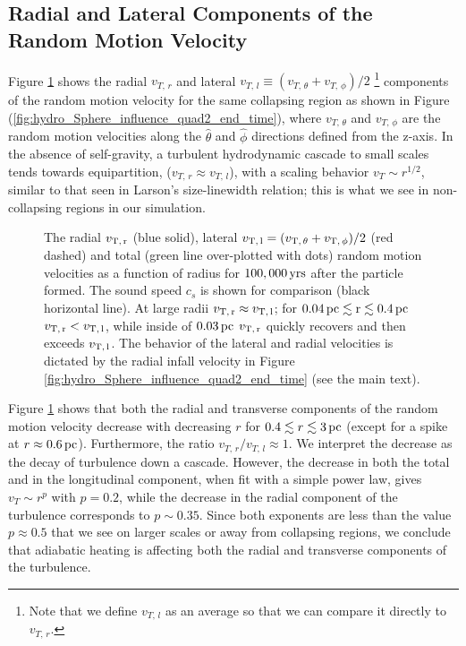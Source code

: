 \documentclass[../dissertation.tex]{subfiles}
\begin{document}
\subsection{Radial and Lateral Components of the Random Motion
  Velocity}\label{sec:hydro_turbulent components}
Figure \ref{fig:hydro_make_up_of_Turbulent} shows the radial 
$v_{T,\,r}$ and lateral 
$v_{T,\,l}\equiv (v_{T,\,\theta}+v_{T,\,\phi})/2$ \footnote{Note that we define $v_{T,\,l}$ as an average so that we can compare it directly to $v_{T,\,r}$.}
components of the random motion velocity for the same collapsing region as 
shown in Figure (\ref{fig:hydro_Sphere_influence_quad2_end_time}), where 
$v_{T,\,\theta}$ and $v_{T,\,\phi}$ are the random motion velocities 
along the $\hat{\theta}$ and $\hat{\phi}$ directions defined 
from the z-axis. In the absence of self-gravity,
a turbulent hydrodynamic cascade to small scales tends towards
equipartition, ($v_{T,\,r}\approx v_{T,\,l}$), with a scaling behavior
$v_T\sim r^{1/2}$, similar to that seen in Larson's size-linewidth relation; this is
what we see in non-collapsing regions in our simulation. 

%
\begin{figure}[htb]%
\caption[Hydro Radial vs Lateral Turbulence]{The radial $v_{\rm T,\, r}$ (blue solid), lateral 
$v_{\rm T,\, l}=(v_{{\rm T},\,\theta}+v_{{\rm T},\,\phi})/2$ (red dashed) and total 
(green line over-plotted with dots) random motion velocities as a function of 
radius for \partB 
$100,000\,\rm yrs$ after the particle formed. The sound speed $c_s$ is shown for 
comparison (black horizontal line).
At large radii $v_{\rm T,\, r}\approx v_{\rm T,\, l}$; for 
$0.04\,\rm pc\lesssim r\lesssim 0.4\,\rm pc$
$v_{\rm T,\, r}< v_{\rm T,\, l}$, while inside of 
$0.03\,\rm pc$ $v_{\rm T,\, r}$ quickly recovers and
then exceeds $v_{\rm T,\, l}$.
The behavior of the lateral and radial velocities is dictated by the 
radial infall velocity in Figure \ref{fig:hydro_Sphere_influence_quad2_end_time} 
(see the main text). \label{fig:hydro_make_up_of_Turbulent}}
\end{figure}
%

Figure \ref{fig:hydro_make_up_of_Turbulent} shows that both the radial and
transverse components of the random motion velocity decrease with
decreasing $r$ for $0.4\lesssim r\lesssim 3\,\rm pc$ (except for a spike
at $r\approx0.6\,\rm pc$). Furthermore, the ratio $v_{T,\, r}/v_{T,\, l}\approx 1$. 
We interpret the decrease as the decay of turbulence down a cascade.
However, the decrease in both the total and in the
longitudinal component, when fit with a simple power law, 
gives $v_T\sim r^p$ with $p=0.2$,
while the decrease in the radial component of the turbulence
corresponds to $p\sim0.35$. Since both exponents are less than the
value $p\approx0.5$ that we see on larger scales or away from collapsing
regions, we conclude that adiabatic heating is affecting both the
radial and transverse components of the turbulence.
\end{document}
